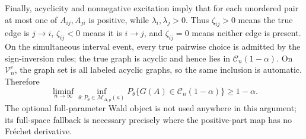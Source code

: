 Finally, acyclicity and nonnegative excitation imply that for each unordered pair at most one of \(A_{ij},A_{ji}\) is positive, while \(\lambda_i,\lambda_j>0\).  Thus \(\zeta_{ij}>0\) means the true edge is \(j\to i\), \(\zeta_{ij}<0\) means it is \(i\to j\), and \(\zeta_{ij}=0\) means neither edge is present.  On the simultaneous interval event, every true pairwise choice is admitted by the sign-inversion rules; the true graph is acyclic and hence lies in \(\mathcal C_n(1-\alpha)\).  On \(\mathcal V_n^c\), the graph set is all labeled acyclic graphs, so the same inclusion is automatic.  Therefore
\[
 \liminf_{n\to\infty}\inf_{\theta:P_\theta\in\mathcal M_{\Delta,p}(\kappa)}
 P_\theta\{G(A)\in\mathcal C_n(1-\alpha)\}\geq1-\alpha.
\]
The optional full-parameter Wald object is not used anywhere in this argument; its full-space fallback is necessary precisely where the positive-part map has no Fr\'{e}chet derivative.